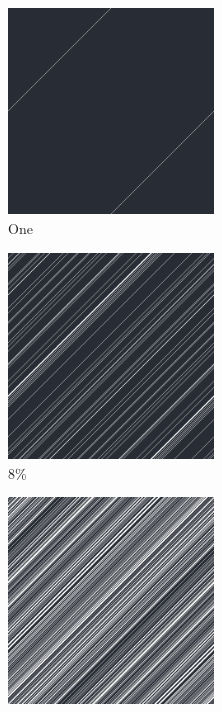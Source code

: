 \documentclass[12pt, fleqn]{report}                             %
\theoremstyle{break}                                            %
\begin{document}
      \begin{figure}[ht!]
        \centering
        \begin{subfigure}[b]{0.4\linewidth}
          \includegraphics[width=0.6\textwidth]{Images/138/a.png}
          \caption{One}
        \end{subfigure}
        \begin{subfigure}[b]{0.4\linewidth}
          \includegraphics[width=0.6\textwidth]{Images/138/b.png}
          \caption{8\%}
        \end{subfigure}
        \begin{subfigure}[b]{0.4\linewidth}
          \includegraphics[width=0.6\textwidth]{Images/138/c.png}

\end{subfigure}
\end{figure}
\end{document}
